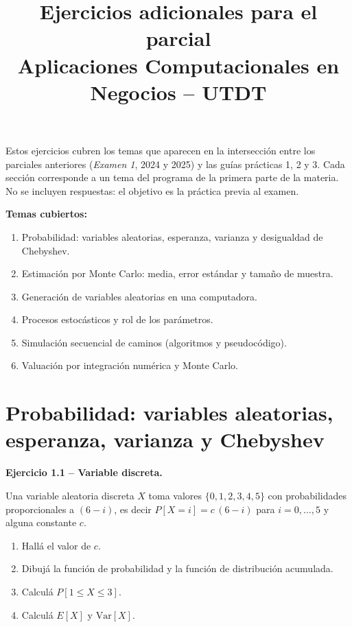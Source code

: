 \documentclass[11pt,a4paper]{article}
\title{\textbf{Ejercicios adicionales para el parcial}\\[0.3em]
\large Aplicaciones Computacionales en Negocios -- UTDT}
\author{}
\date{}
\newcommand{\ejercicio}[1]{\par\medskip\noindent\textbf{#1}\par\nopagebreak\smallskip}
\begin{document}
\maketitle
\thispagestyle{fancy}

\noindent
Estos ejercicios cubren los temas que aparecen en la intersecci\'on entre los
par\-ciales anteriores (\emph{Examen 1}, 2024 y 2025) y las gu\'ias pr\'acticas 1,
2 y 3. Cada secci\'on corresponde a un tema del programa de la primera parte de la
materia. No se incluyen respuestas: el objetivo es la pr\'actica previa al examen.

\medskip
\noindent\textbf{Temas cubiertos:}
\begin{enumerate}[label=\arabic*.,leftmargin=2em,itemsep=1pt]
  \item Probabilidad: variables aleatorias, esperanza, varianza y desigualdad de Chebyshev.
  \item Estimaci\'on por Monte Carlo: media, error est\'andar y tama\~no de muestra.
  \item Generaci\'on de variables aleatorias en una computadora.
  \item Procesos estoc\'asticos y rol de los par\'ametros.
  \item Simulaci\'on secuencial de caminos (algoritmos y pseudoc\'odigo).
  \item Valuaci\'on por integraci\'on num\'erica y Monte Carlo.
\end{enumerate}

\section{Probabilidad: variables aleatorias, esperanza, varianza y Chebyshev}

\ejercicio{Ejercicio 1.1 -- Variable discreta.}
Una variable aleatoria discreta $X$ toma valores $\{0,1,2,3,4,5\}$ con
probabilidades proporcionales a $(6-i)$, es decir $P[X=i]=c\,(6-i)$ para
$i=0,\dots,5$ y alguna constante $c$.
\begin{enumerate}[label=(\alph*)]
  \item Hall\'a el valor de $c$.
  \item Dibuj\'a la funci\'on de probabilidad y la funci\'on de distribuci\'on acumulada.
  \item Calcul\'a $P[1\le X\le 3]$.
  \item Calcul\'a $E[X]$ y $\mathrm{Var}[X]$.
\end{enumerate}
\end{document}
